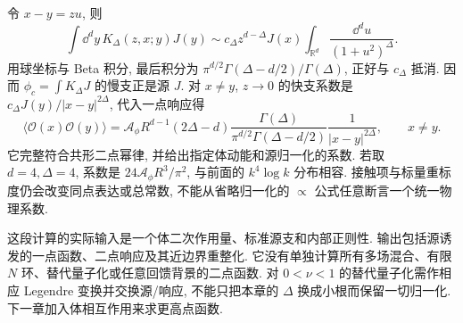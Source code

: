 令 $x-y=zu$, 则
\[
\int\dd^dy\,K_\Delta(z,x;y)J(y)
\sim c_\Delta z^{d-\Delta}J(x)
\int_{\mathbb R^d}\frac{\dd^du}{(1+u^2)^\Delta}.
\]
用球坐标与 Beta 积分, 最后积分为 $\pi^{d/2}\Gamma(\Delta-d/2)/\Gamma(\Delta)$, 正好与 $c_\Delta$ 抵消. 因而 $\phi_c=\int K_\Delta J$ 的慢支正是源 $J$. 对 $x\ne y$, $z\to0$ 的快支系数是 $c_\Delta J(y)/|x-y|^{2\Delta}$, 代入一点响应得
\[
\boxed{\langle\mathcal O(x)\mathcal O(y)\rangle
=\mathcal A_\phi R^{d-1}(2\Delta-d)
\frac{\Gamma(\Delta)}{\pi^{d/2}\Gamma(\Delta-d/2)}
\frac1{|x-y|^{2\Delta}}},\qquad x\ne y.
\]
它完整符合共形二点幂律, 并给出指定体动能和源归一化的系数. 若取 $d=4,\Delta=4$, 系数是 $24\mathcal A_\phi R^3/\pi^2$, 与前面的 $k^4\log k$ 分布相容. 接触项与标量重标度仍会改变同点表达或总常数, 不能从省略归一化的 $\propto$ 公式任意断言一个统一物理系数.

这段计算的实际输入是一个体二次作用量、标准源支和内部正则性. 输出包括源诱发的一点函数、二点响应及其近边界重整化. 它没有单独计算所有多场混合、有限 $N$ 环、替代量子化或任意回馈背景的二点函数. 对 $0<\nu<1$ 的替代量子化需作相应 Legendre 变换并交换源/响应, 不能只把本章的 $\Delta$ 换成小根而保留一切归一化. 下一章加入体相互作用来求更高点函数.
